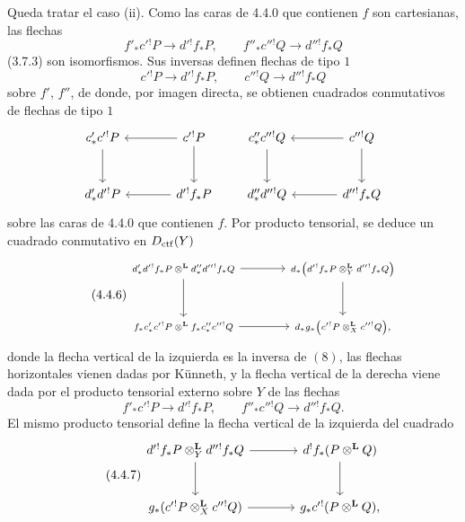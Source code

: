 \begin{prooftext}[Demostración]
Queda tratar el caso (ii). Como las caras de 4.4.0 que contienen $f$ son cartesianas, las flechas
\[
f'_*c'{}^!P\longrightarrow d'{}^!f_*P,\qquad
f''_*c''{}^!Q\longrightarrow d''{}^!f_*Q
\]
(3.7.3) son isomorfismos. Sus inversas definen flechas de tipo $1$
\[
c'{}^!P\longrightarrow d'{}^!f_*P,\qquad
c''{}^!Q\longrightarrow d''{}^!f_*Q
\]
sobre $f'$, $f''$, de donde, por imagen directa, se obtienen cuadrados conmutativos de flechas de tipo $1$
\[
\begin{tikzcd}[column sep=large,row sep=large]
c'_*c'{}^!P \arrow[d] & c'{}^!P\arrow[l]\arrow[d]\\
d'_*d'{}^!P & d'{}^!f_*P\arrow[l]
\end{tikzcd}
\qquad
\begin{tikzcd}[column sep=large,row sep=large]
c''_*c''{}^!Q \arrow[d] & c''{}^!Q\arrow[l]\arrow[d]\\
d''_*d''{}^!Q & d''{}^!f_*Q\arrow[l]
\end{tikzcd}
\]
sobre las caras de 4.4.0 que contienen $f$. Por producto tensorial, se deduce un cuadrado conmutativo en $D_{\mathrm{ctf}}(Y)$
\begin{equation}
\tag{4.4.6}
\begin{tikzcd}[column sep=large,row sep=large,cells={nodes={font=\scriptsize}}]
d'_*d'{}^!f_*P\otimes^{\mathbf L}d''_*d''{}^!f_*Q
 \arrow[r]\arrow[d] &
d_*\bigl(d'{}^!f_*P\otimes_Y^{\mathbf L}d''{}^!f_*Q\bigr)\arrow[d]\\
f_*c'_*c'{}^!P\otimes^{\mathbf L}f_*c''_*c''{}^!Q
 \arrow[r] &
d_*g_*\bigl(c'{}^!P\otimes_X^{\mathbf L}c''{}^!Q\bigr),
\end{tikzcd}
\end{equation}
donde la flecha vertical de la izquierda es la inversa de $(8)$, las flechas horizontales vienen dadas por Künneth, y la flecha vertical de la derecha viene dada por el producto tensorial externo sobre $Y$ de las flechas
\[
f'_*c'{}^!P\longrightarrow d'{}^!f_*P,\qquad
f''_*c''{}^!Q\longrightarrow d''{}^!f_*Q.
\]
El mismo producto tensorial define la flecha vertical de la izquierda del cuadrado
\begin{equation}
\tag{4.4.7}
\begin{tikzcd}[column sep=large,row sep=large]
d'{}^!f_*P\otimes_Y^{\mathbf L}d''{}^!f_*Q
 \arrow[r]\arrow[d] &
d^!f_*(P\otimes^{\mathbf L}Q)\arrow[d]\\
g_*(c'{}^!P\otimes_X^{\mathbf L}c''{}^!Q)
 \arrow[r] &
g_*c'{}^!(P\otimes^{\mathbf L}Q),
\end{tikzcd}
\end{equation}

\end{prooftext}
